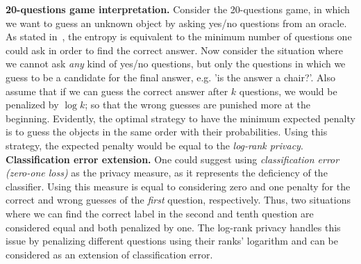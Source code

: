 \documentclass[10pt,journal,compsoc]{IEEEtran}
\begin{document}
\textbf{20-questions game interpretation.} Consider the 20-questions game, in which we want to guess an unknown object by asking yes/no questions from an oracle. As stated in~\cite{cover2012}, the entropy is equivalent to the minimum number of questions one could ask in order to find the correct answer. Now consider the situation where we cannot ask \emph{any} kind of yes/no questions, but only the questions in which we guess to be a candidate for the final answer, e.g. 'is the answer a chair?'. Also assume that if we can guess the correct answer after $k$ questions, we would be penalized by $\log k$; so that the wrong guesses are punished more at the beginning. Evidently, the optimal strategy to have the minimum expected penalty is to guess the objects in the same order with their probabilities. Using this strategy, the expected penalty would be equal to the \emph{log-rank privacy}. \\


\textbf{Classification error extension.} One could suggest using \emph{classification error (zero-one loss)} as the privacy measure, as it represents the deficiency of the classifier. Using this measure is equal to considering zero and one penalty for the correct and wrong guesses of the \emph{first} question, respectively. Thus, two situations where we can find the correct label in the second and tenth question are considered equal and both penalized by one. The log-rank privacy handles this issue by penalizing different questions using their ranks' logarithm and can be considered as an extension of classification error. \\
\end{document}
